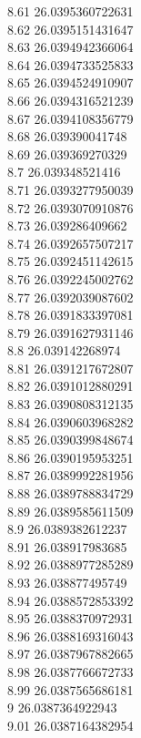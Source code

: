 {8.61	26.0395360722631\\
8.62	26.0395151431647\\
8.63	26.0394942366064\\
8.64	26.0394733525833\\
8.65	26.0394524910907\\
8.66	26.0394316521239\\
8.67	26.0394108356779\\
8.68	26.039390041748\\
8.69	26.039369270329\\
8.7	26.039348521416\\
8.71	26.0393277950039\\
8.72	26.0393070910876\\
8.73	26.039286409662\\
8.74	26.0392657507217\\
8.75	26.0392451142615\\
8.76	26.0392245002762\\
8.77	26.0392039087602\\
8.78	26.0391833397081\\
8.79	26.0391627931146\\
8.8	26.039142268974\\
8.81	26.0391217672807\\
8.82	26.0391012880291\\
8.83	26.0390808312135\\
8.84	26.0390603968282\\
8.85	26.0390399848674\\
8.86	26.0390195953251\\
8.87	26.0389992281956\\
8.88	26.0389788834729\\
8.89	26.0389585611509\\
8.9	26.0389382612237\\
8.91	26.038917983685\\
8.92	26.0388977285289\\
8.93	26.038877495749\\
8.94	26.0388572853392\\
8.95	26.0388370972931\\
8.96	26.0388169316043\\
8.97	26.0387967882665\\
8.98	26.0387766672733\\
8.99	26.0387565686181\\
9	26.0387364922943\\
9.01	26.0387164382954\\
}
